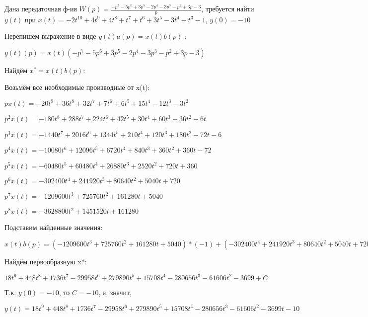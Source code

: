 \documentclass{article}
\begin{document}
{{Дана передаточная ф-ия $W(p)=\frac{-p^{7}-5p^{6}+3p^{5}-2p^{4}-3p^{3}-p^{2}+3p-3}{p}$, требуется найти $y(t)$ при $x(t)=-2t^{10}+4t^{9}+4t^{8}+t^{7}+t^{6}+3t^{5}-3t^{4}-t^{3}-1$, $y(0)=-10$

Перепишем выражение в виде $y(t)a(p)=x(t)b(p)$ :

$y(t)(p)=x(t)(-p^{7}-5p^{6}+3p^{5}-2p^{4}-3p^{3}-p^{2}+3p-3)$

Найдём $x^*=x(t)b(p)$:

Возьмём все необходимые производные от x(t):

$px(t)=-20t^{9}+36t^{8}+32t^{7}+7t^{6}+6t^{5}+15t^{4}-12t^{3}-3t^{2}$

$p^2x(t)=-180t^{8}+288t^{7}+224t^{6}+42t^{5}+30t^{4}+60t^{3}-36t^{2}-6t$

$p^3x(t)=-1440t^{7}+2016t^{6}+1344t^{5}+210t^{4}+120t^{3}+180t^{2}-72t-6$

$p^4x(t)=-10080t^{6}+12096t^{5}+6720t^{4}+840t^{3}+360t^{2}+360t-72$

$p^5x(t)=-60480t^{5}+60480t^{4}+26880t^{3}+2520t^{2}+720t+360$

$p^6x(t)=-302400t^{4}+241920t^{3}+80640t^{2}+5040t+720$

$p^7x(t)=-1209600t^{3}+725760t^{2}+161280t+5040$

$p^8x(t)=-3628800t^{2}+1451520t+161280$

Подставим найденные значения:

$x(t)b(p) = (-1209600t^{3}+725760t^{2}+161280t+5040)*(-1)+(-302400t^{4}+241920t^{3}+80640t^{2}+5040t+720)*(-5)+(-60480t^{5}+60480t^{4}+26880t^{3}+2520t^{2}+720t+360)*3+(-10080t^{6}+12096t^{5}+6720t^{4}+840t^{3}+360t^{2}+360t-72)*(-2)+(-1440t^{7}+2016t^{6}+1344t^{5}+210t^{4}+120t^{3}+180t^{2}-72t-6)*(-3)+(-180t^{8}+288t^{7}+224t^{6}+42t^{5}+30t^{4}+60t^{3}-36t^{2}-6t)*(-1)+(-20t^{9}+36t^{8}+32t^{7}+7t^{6}+6t^{5}+15t^{4}-12t^{3}-3t^{2})*3+(-20t^{9}+36t^{8}+32t^{7}+7t^{6}+6t^{5}+15t^{4}-12t^{3}-3t^{2})*(-3)=180t^{8}+4032t^{7}+13888t^{6}-209706t^{5}+1679340t^{4}+78540t^{3}-1122624t^{2}-184818t$





Найдём первообразную x*:

$18t^{9}+448t^{8}+1736t^{7}-29958t^{6}+279890t^{5}+15708t^{4}-280656t^{3}-61606t^{2}-3699+C.$

Т.к. $y(0)=-10$, то $C=-10$, а, значит, 

$y(t)=18t^{9}+448t^{8}+1736t^{7}-29958t^{6}+279890t^{5}+15708t^{4}-280656t^{3}-61606t^{2}-3699t-10$

}}
\end{document}

